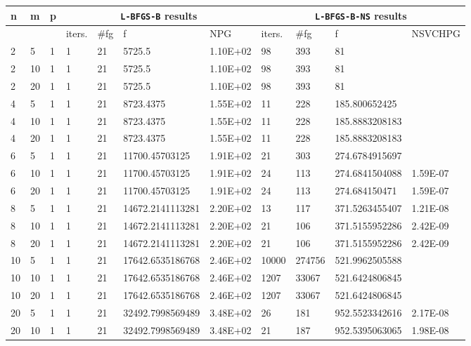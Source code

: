 \begin{table}
  \scriptsize
  \begin{center}
    \begin{tabular}{|l|l|l|l|l|l|l|l|l|l|l|}
      \hline
      n  &  m  &  p  & \multicolumn{4}{|c|}{\texttt{L-BFGS-B} results} & \multicolumn{4}{|c|}{\texttt{L-BFGS-B-NS} results} \\ \hline
      & &  & iters. & \#fg & f & NPG & iters. & \#fg & f & NSVCHPG \\ \hline
      2 & 5 & 1 & 1 & 21 & 5725.5 & 1.10E+02 & 98 & 393 & 81 &  \\
      2 & 10 & 1 & 1 & 21 & 5725.5 & 1.10E+02 & 98 & 393 & 81 & \\
      2 & 20 & 1 & 1 & 21 & 5725.5 & 1.10E+02 & 98 & 393 & 81 & \\
      4 & 5 & 1 & 1 & 21 & 8723.4375 & 1.55E+02 & 11 & 228 & 185.800652425 & \\
      4 & 10 & 1 & 1 & 21 & 8723.4375 & 1.55E+02 & 11 & 228 & 185.8883208183 & \\
      4 & 20 & 1 & 1 & 21 & 8723.4375 & 1.55E+02 & 11 & 228 & 185.8883208183 & \\
      6 & 5 & 1 & 1 & 21 & 11700.45703125 & 1.91E+02 & 21 & 303 & 274.6784915697 &\\ 
      6 & 10 & 1 & 1 & 21 & 11700.45703125 & 1.91E+02 & 24 & 113 & 274.6841504088 & 1.59E-07\\
      6 & 20 & 1 & 1 & 21 & 11700.45703125 & 1.91E+02 & 24 & 113 & 274.684150471 & 1.59E-07\\
      8 & 5 & 1 & 1 & 21 & 14672.2141113281 & 2.20E+02 & 13 & 117 & 371.5263455407 & 1.21E-08\\
      8 & 10 & 1 & 1 & 21 & 14672.2141113281 & 2.20E+02 & 21 & 106 & 371.5155952286 & 2.42E-09\\
      8 & 20 & 1 & 1 & 21 & 14672.2141113281 & 2.20E+02 & 21 & 106 & 371.5155952286 & 2.42E-09\\
      10 & 5 & 1 & 1 & 21 & 17642.6535186768 & 2.46E+02 & 10000 & 274756 & 521.9962505588 & \\
      10 & 10 & 1 & 1 & 21 & 17642.6535186768 & 2.46E+02 & 1207 & 33067 & 521.6424806845 & \\
      10 & 20 & 1 & 1 & 21 & 17642.6535186768 & 2.46E+02 & 1207 & 33067 & 521.6424806845 & \\
      20 & 5 & 1 & 1 & 21 & 32492.7998569489 & 3.48E+02 & 26 & 181 & 952.5523342616 & 2.17E-08\\
      20 & 10 & 1 & 1 & 21 & 32492.7998569489 & 3.48E+02 & 21 & 187 & 952.5395063065 & 1.98E-08\\

\end{tabular}
\end{center}
\end{table}
